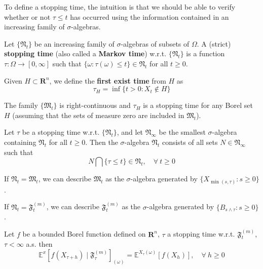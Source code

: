 To define a stopping time, the intuition is that we should be able to verify whether or not $\tau \leq t$ has occurred using the information contained in an increasing family of $\sigma$-algebras. 

\begin{definition}
    Let $\{ \mathfrak{N}_t \}$ be an increasing family of $\sigma$-algebras of subsets of $\Omega$. A (strict) \textbf{stopping time} (also called a \textbf{Markov time}) w.r.t. $\{ \mathfrak{N}_t \}$ is a function $\tau : \Omega \longrightarrow [0, \infty]$ such that $\{ \omega : \tau(\omega) \leq t \} \in \mathfrak{N}_t$ for all $t \geq 0$.
\end{definition}

\begin{definition}
    Given $H \subset \textbf{R}^n$, we define the \textbf{first exist time} from $H$ as 
    \[
        \tau_H = \inf \{ t > 0 : X_t \notin H \}
    \]
\end{definition}

\begin{remark}
    The family $\{ \mathfrak{M}_t \}$ is right-continuous and $\tau_H$ is a stopping time for any Borel set $H$ (assuming that the sets of measure zero are included in $\mathfrak{M}_t$).
\end{remark}

\begin{definition}
    Let $\tau$ be a stopping time w.r.t. $\{ \mathfrak{N}_t \}$, and let $\mathfrak{N}_\infty$ be the smallest $\sigma$-algebra containing $\mathfrak{N}_t$ for all $t \geq 0$. Then the $\sigma$-algebra $\mathfrak{N}_t$ consists of all sets $N \in \mathfrak{N}_\infty$ such that 
    \[
        N \bigcap \{ \tau \leq t \} \in \mathfrak{N}_t, \quad \forall ~t\geq 0
    \]
\end{definition}

\begin{remark}
    If $\mathfrak{N}_t = \mathfrak{M}_t$, we can describe $\mathfrak{M}_t$ as the $\sigma$-algebra generated by $\{ X_{\min(s, \tau)} : s \geq 0 \}$.

    If $\mathfrak{N}_t = \mathfrak{F}_t^{(m)}$, we can describe $\mathfrak{F}_t^{(m)}$ as the $\sigma$-algebra generated by $\{ B_{s \wedge \tau} : s \geq 0 \}$.
\end{remark}

\begin{theorem}
    Let $f$ be a bounded Borel function defined on $\textbf{R}^n$, $\tau$ a stopping time w.r.t. $\mathfrak{F}_t^{(m)}$, $\tau < \infty$ a.s. then 
    \begin{equation}\label{eq:str_markov_property}
        \mathbb{E}^x [f(X_{\tau+h}) \mid \mathfrak{F}_\tau^{(m)}]_{(\omega)} = \mathbb{E}^{X_\tau(\omega)} [f(X_h)], \quad \forall ~h \geq 0
    \end{equation}
\end{theorem}

